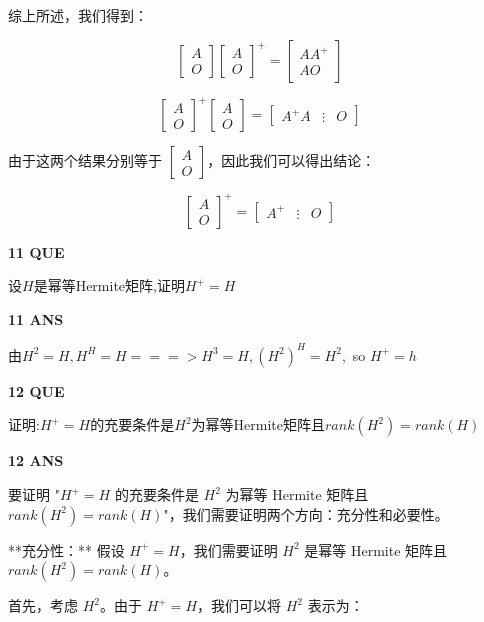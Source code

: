 \documentclass[11pt,letterpaper]{ctexart}
\begin{document}
\begin{enumerate}
综上所述，我们得到：

$$\begin{bmatrix} A \\ O \end{bmatrix} \begin{bmatrix} A \\ O \end{bmatrix}^+ = \begin{bmatrix} A A^+ \\ A O \end{bmatrix}$$

$$\begin{bmatrix} A \\ O \end{bmatrix}^+ \begin{bmatrix} A \\ O \end{bmatrix} = \begin{bmatrix} A^+ A & \vdots & O \end{bmatrix}$$

由于这两个结果分别等于 $\begin{bmatrix} A \\ O \end{bmatrix}$，因此我们可以得出结论：

$$\begin{bmatrix} A \\ O \end{bmatrix}^+ = \begin{bmatrix} A^+ & \vdots & O \end{bmatrix}$$


\textbf{11 QUE}
\bigskip

设$H$是幂等Hermite矩阵,证明$H^{+} = H$


\textbf{11 ANS}
\bigskip

由$H^2 = H, H^H = H ===> H^3 = H, (H^2)^H = H^2,$ so $H^+ = h$


\textbf{12 QUE}
\bigskip

证明:$H^{+} = H$的充要条件是$H^2$为幂等Hermite矩阵且$rank(H^2) = rank(H)$


\textbf{12 ANS}
\bigskip

要证明 "$H^{+} = H$ 的充要条件是 $H^2$ 为幂等 Hermite 矩阵且 $rank(H^2) = rank(H)$"，我们需要证明两个方向：充分性和必要性。

**充分性：** 假设 $H^{+} = H$，我们需要证明 $H^2$ 是幂等 Hermite 矩阵且 $rank(H^2) = rank(H)$。

首先，考虑 $H^2$。由于 $H^{+} = H$，我们可以将 $H^2$ 表示为：


\end{enumerate}
\end{document}
